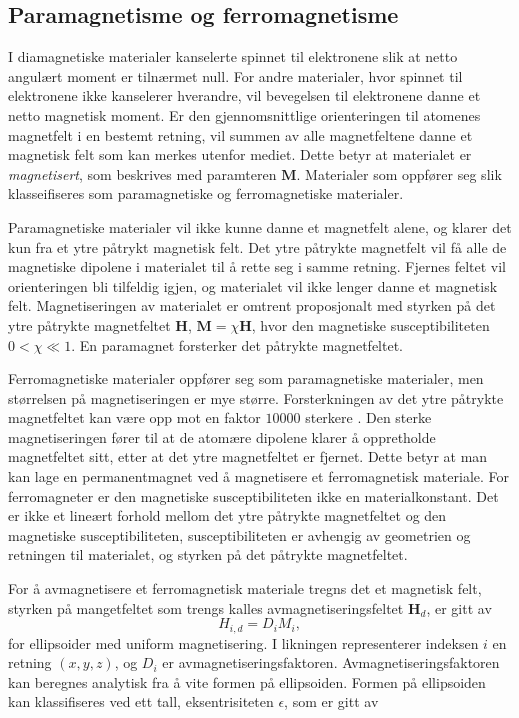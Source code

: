 \documentclass[%
 reprint,
 amsmath,amssymb,
 aps,
 norsk,
]{revtex4-1}
\begin{document}
\subsection{Paramagnetisme og ferromagnetisme}
I diamagnetiske materialer kanselerte spinnet til elektronene slik at netto angulært moment er tilnærmet null. For andre materialer, hvor spinnet til elektronene ikke kanselerer hverandre, vil bevegelsen til elektronene danne et netto magnetisk moment. Er den gjennomsnittlige orienteringen til atomenes magnetfelt i en bestemt retning, vil summen av alle magnetfeltene danne et magnetisk felt som kan merkes utenfor mediet. Dette betyr at materialet er \textit{magnetisert}, som beskrives med paramteren $\bm{M}$. Materialer som oppfører seg slik klasseifiseres som paramagnetiske og ferromagnetiske materialer.\par
Paramagnetiske materialer vil ikke kunne danne et magnetfelt alene, og klarer det kun fra et ytre påtrykt magnetisk felt. Det ytre påtrykte magnetfelt vil få alle de magnetiske dipolene i materialet til å rette seg i samme retning. Fjernes feltet vil orienteringen bli tilfeldig igjen, og materialet vil ikke lenger danne et magnetisk felt. Magnetiseringen av materialet er omtrent proposjonalt med styrken på det ytre påtrykte magnetfeltet $\bm{H}$, $\bm{M} = \chi\bm{H}$, hvor den magnetiske susceptibiliteten $0<\chi\ll1$. En paramagnet forsterker det påtrykte magnetfeltet.
\par
Ferromagnetiske materialer oppfører seg som paramagnetiske materialer, men størrelsen på magnetiseringen er mye større. Forsterkningen av det ytre påtrykte magnetfeltet kan være opp mot en faktor $10 000$ sterkere \cite{oppgave}. Den sterke magnetiseringen fører til at de atomære dipolene klarer å oppretholde magnetfeltet sitt, etter at det ytre magnetfeltet er fjernet. Dette betyr at man kan lage en permanentmagnet ved å magnetisere et ferromagnetisk materiale. For ferromagneter er den magnetiske susceptibiliteten ikke en materialkonstant. Det er ikke et lineært forhold mellom det ytre påtrykte magnetfeltet og den magnetiske susceptibiliteten, susceptibiliteten er avhengig av geometrien og retningen til materialet, og styrken på det påtrykte magnetfeltet.
\par
For å avmagnetisere et ferromagnetisk materiale tregns det et magnetisk felt, styrken på mangetfeltet som trengs kalles avmagnetiseringsfeltet $\bm{H}_d$, er gitt av
\begin{equation}
  H_{i, d} = D_iM_i,
\end{equation}
for ellipsoider med uniform magnetisering. I likningen representerer indeksen $i$ en retning $(x, y, z)$, og $D_i$ er avmagnetiseringsfaktoren. Avmagnetiseringsfaktoren kan beregnes analytisk fra å vite formen på ellipsoiden. Formen på ellipsoiden kan klassifiseres ved ett tall, eksentrisiteten $\epsilon$, som er gitt av
\end{document}
